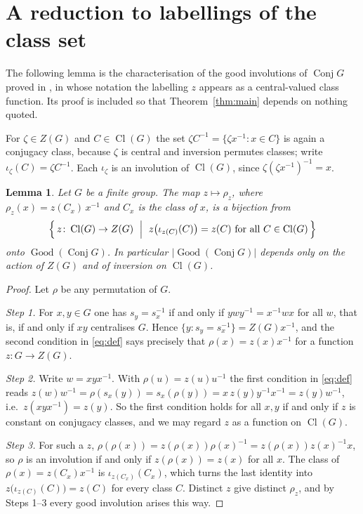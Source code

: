 \documentclass[11pt]{amsart}
\newtheorem{lemma}[theorem]{Lemma}
\theoremstyle{definition}
\newcommand{\Conj}{\operatorname{Conj}}
\newcommand{\Good}{\operatorname{Good}}
\newcommand{\Cl}{\operatorname{Cl}}
\newcommand{\Zc}{Z}
\begin{document}
\section{A reduction to labellings of the class set}

The following lemma is the characterisation of the good involutions of $\Conj G$ proved in
\cite{Ta}, in whose notation the labelling $z$ appears as a central-valued class function.
Its proof is included so that Theorem~\ref{thm:main} depends on nothing quoted.

For $\zeta\in \Zc(G)$ and $C\in\Cl(G)$ the set $\zeta C^{-1}=\{\zeta x^{-1}:x\in C\}$ is
again a conjugacy class, because $\zeta$ is central and inversion permutes classes; write
$\iota_\zeta(C)=\zeta C^{-1}$. Each $\iota_\zeta$ is an involution of $\Cl(G)$, since
$\zeta(\zeta x^{-1})^{-1}=x$.

\begin{lemma}\label{lem:red}
Let $G$ be a finite group. The map $z\mapsto\rho_z$, where
$\rho_z(x)=z(C_x)\,x^{-1}$ and $C_x$ is the class of $x$, is a bijection from
\[
 \Bigl\{\,z\colon\Cl(G)\to \Zc(G)\ \Bigm|\
 z\bigl(\iota_{z(C)}(C)\bigr)=z(C)\ \text{for all }C\in\Cl(G)\,\Bigr\}
\]
onto $\Good(\Conj G)$. In particular $\lvert\Good(\Conj G)\rvert$ depends only on the
action of $\Zc(G)$ and of inversion on $\Cl(G)$.
\end{lemma}

\begin{proof}
Let $\rho$ be any permutation of $G$.

\emph{Step 1.} For $x,y\in G$ one has $s_y=s_x^{-1}$ if and only if $yw y^{-1}=x^{-1}wx$
for all $w$, that is, if and only if $xy$ centralises $G$. Hence
$\{y: s_y=s_x^{-1}\}=\Zc(G)x^{-1}$, and the second condition in \eqref{eq:def} says
precisely that $\rho(x)=z(x)x^{-1}$ for a function $z\colon G\to \Zc(G)$.

\emph{Step 2.} Write $w=xyx^{-1}$. With $\rho(u)=z(u)u^{-1}$ the first condition in
\eqref{eq:def} reads
$z(w)w^{-1}=\rho(s_x(y))=s_x(\rho(y))=x\,z(y)y^{-1}x^{-1}=z(y)w^{-1}$, i.e.\
$z(xyx^{-1})=z(y)$. So the first condition holds for all $x,y$ if and only if $z$ is
constant on conjugacy classes, and we may regard $z$ as a function on $\Cl(G)$.

\emph{Step 3.} For such a $z$,
$\rho(\rho(x))=z(\rho(x))\rho(x)^{-1}=z(\rho(x))z(x)^{-1}x$, so $\rho$ is an involution if
and only if $z(\rho(x))=z(x)$ for all $x$. The class of $\rho(x)=z(C_x)x^{-1}$ is
$\iota_{z(C_x)}(C_x)$, which turns the last identity into
$z\bigl(\iota_{z(C)}(C)\bigr)=z(C)$ for every class $C$. Distinct $z$ give distinct
$\rho_z$, and by Steps 1--3 every good involution arises this way.
\end{proof}
\end{document}
